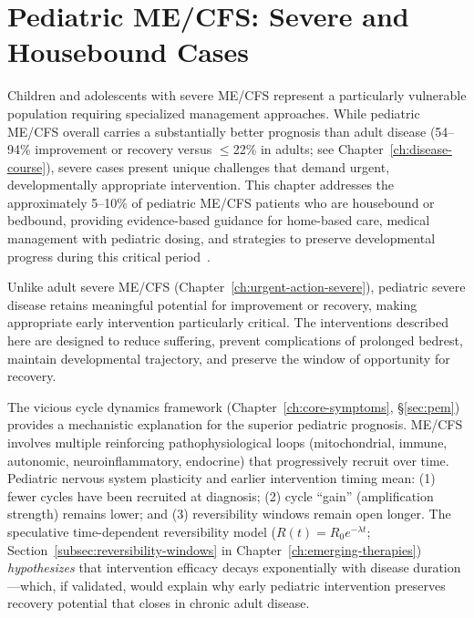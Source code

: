 \chapter{Pediatric ME/CFS: Severe and Housebound Cases}
\label{ch:pediatric-severe}

Children and adolescents with severe ME/CFS represent a particularly vulnerable population requiring specialized management approaches. While pediatric ME/CFS overall carries a substantially better prognosis than adult disease (54--94\% improvement or recovery versus $\leq$22\% in adults; see Chapter~\ref{ch:disease-course}), severe cases present unique challenges that demand urgent, developmentally appropriate intervention. This chapter addresses the approximately 5--10\% of pediatric ME/CFS patients who are housebound or bedbound, providing evidence-based guidance for home-based care, medical management with pediatric dosing, and strategies to preserve developmental progress during this critical period~\cite{Rowe2017pediatric, CDC2024pediatric}.

Unlike adult severe ME/CFS (Chapter~\ref{ch:urgent-action-severe}), pediatric severe disease retains meaningful potential for improvement or recovery, making appropriate early intervention particularly critical. The interventions described here are designed to reduce suffering, prevent complications of prolonged bedrest, maintain developmental trajectory, and preserve the window of opportunity for recovery.

\begin{keypoint}
The vicious cycle dynamics framework (Chapter~\ref{ch:core-symptoms}, \S\ref{sec:pem}) provides a mechanistic explanation for the superior pediatric prognosis. ME/CFS involves multiple reinforcing pathophysiological loops (mitochondrial, immune, autonomic, neuroinflammatory, endocrine) that progressively recruit over time. Pediatric nervous system plasticity and earlier intervention timing mean: (1) fewer cycles have been recruited at diagnosis; (2) cycle ``gain'' (amplification strength) remains lower; and (3) reversibility windows remain open longer. The speculative time-dependent reversibility model ($R(t) = R_0 e^{-\lambda t}$; Section~\ref{subsec:reversibility-windows} in Chapter~\ref{ch:emerging-therapies}) \emph{hypothesizes} that intervention efficacy decays exponentially with disease duration---which, if validated, would explain why early pediatric intervention preserves recovery potential that closes in chronic adult disease.
\end{keypoint}

